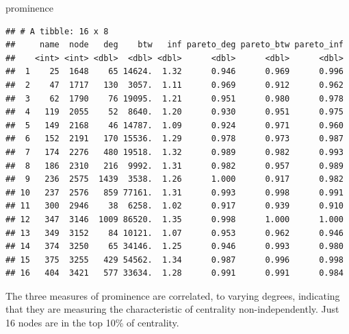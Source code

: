 \documentclass[]{article}
\newenvironment{Shaded}{\begin{snugshade}}{\end{snugshade}}
\newcommand{\DataTypeTok}[1]{\textcolor[rgb]{0.13,0.29,0.53}{#1}}
\newcommand{\KeywordTok}[1]{\textcolor[rgb]{0.13,0.29,0.53}{\textbf{#1}}}
\newcommand{\NormalTok}[1]{#1}
\newcommand{\OperatorTok}[1]{\textcolor[rgb]{0.81,0.36,0.00}{\textbf{#1}}}
\newcommand{\StringTok}[1]{\textcolor[rgb]{0.31,0.60,0.02}{#1}}
\begin{document}
\begin{Shaded}
\begin{Highlighting}[]
\NormalTok{prominence}
\end{Highlighting}
\end{Shaded}

\begin{verbatim}
## # A tibble: 16 x 8
##     name  node   deg    btw   inf pareto_deg pareto_btw pareto_inf
##    <int> <int> <dbl>  <dbl> <dbl>      <dbl>      <dbl>      <dbl>
##  1    25  1648    65 14624.  1.32      0.946      0.969      0.996
##  2    47  1717   130  3057.  1.11      0.969      0.912      0.962
##  3    62  1790    76 19095.  1.21      0.951      0.980      0.978
##  4   119  2055    52  8640.  1.20      0.930      0.951      0.975
##  5   149  2168    46 14787.  1.09      0.924      0.971      0.960
##  6   152  2191   170 15536.  1.29      0.978      0.973      0.987
##  7   174  2276   480 19518.  1.32      0.989      0.982      0.993
##  8   186  2310   216  9992.  1.31      0.982      0.957      0.989
##  9   236  2575  1439  3538.  1.26      1.000      0.917      0.982
## 10   237  2576   859 77161.  1.31      0.993      0.998      0.991
## 11   300  2946    38  6258.  1.02      0.917      0.939      0.910
## 12   347  3146  1009 86520.  1.35      0.998      1.000      1.000
## 13   349  3152    84 10121.  1.07      0.953      0.962      0.946
## 14   374  3250    65 34146.  1.25      0.946      0.993      0.980
## 15   375  3255   429 54562.  1.34      0.987      0.996      0.998
## 16   404  3421   577 33634.  1.28      0.991      0.991      0.984
\end{verbatim}

The three measures of prominence are correlated, to varying degrees,
indicating that they are measuring the characteristic of centrality
non-independently. Just 16 nodes are in the top 10\% of centrality.

\begin{Shaded}
\end{Shaded}
\end{document}
